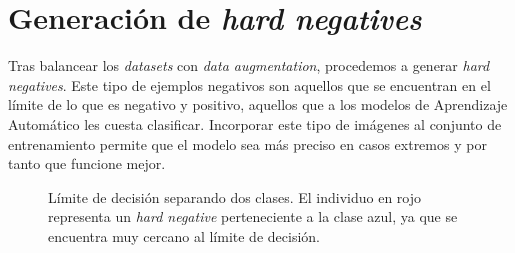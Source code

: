 \newpage
\section{Generación de \textit{hard negatives}}
Tras balancear los \textit{datasets} con \textit{data augmentation}, procedemos a generar \textit{hard negatives}. Este tipo de ejemplos negativos son aquellos que se encuentran en el límite de lo que es negativo y positivo, aquellos que a los modelos de Aprendizaje Automático les cuesta clasificar. Incorporar este tipo de imágenes al conjunto de entrenamiento permite que el modelo sea más preciso en casos extremos y por tanto que funcione mejor.

\begin{figure}[H]
\centering
    \caption{Límite de decisión separando dos clases. El individuo en rojo representa un \textit{hard negative} perteneciente a la clase azul, ya que se encuentra muy cercano al límite de decisión.} 
\end{figure}


